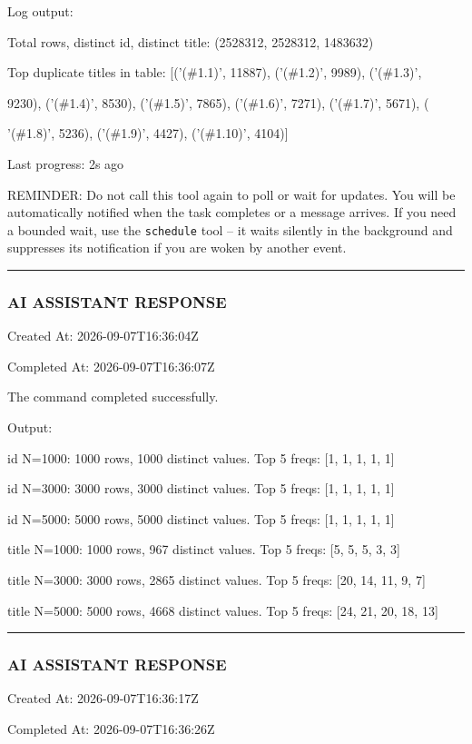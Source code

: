 \documentclass[11pt,a4paper]{article}
\begin{document}
Log output:

Total rows, distinct id, distinct title: (2528312, 2528312, 1483632)

Top duplicate titles in table: [('(\#1.1)', 11887), ('(\#1.2)', 9989), ('(\#1.3)',

9230), ('(\#1.4)', 8530), ('(\#1.5)', 7865), ('(\#1.6)', 7271), ('(\#1.7)', 5671), (

'(\#1.8)', 5236), ('(\#1.9)', 4427), ('(\#1.10)', 4104)]


Last progress: 2s ago



REMINDER: Do not call this tool again to poll or wait for updates. You will be automatically notified when the task completes or a message arrives. If you need a bounded wait, use the \texttt{schedule} tool -- it waits silently in the background and suppresses its notification if you are woken by another event.


\hrule

\subsubsection{AI ASSISTANT RESPONSE}

Created At: 2026-09-07T16:36:04Z

Completed At: 2026-09-07T16:36:07Z


The command completed successfully.

Output:

id N=1000: 1000 rows, 1000 distinct values. Top 5 freqs: [1, 1, 1, 1, 1]

id N=3000: 3000 rows, 3000 distinct values. Top 5 freqs: [1, 1, 1, 1, 1]

id N=5000: 5000 rows, 5000 distinct values. Top 5 freqs: [1, 1, 1, 1, 1]

title N=1000: 1000 rows, 967 distinct values. Top 5 freqs: [5, 5, 5, 3, 3]

title N=3000: 3000 rows, 2865 distinct values. Top 5 freqs: [20, 14, 11, 9, 7]

title N=5000: 5000 rows, 4668 distinct values. Top 5 freqs: [24, 21, 20, 18, 13]


\hrule

\subsubsection{AI ASSISTANT RESPONSE}

Created At: 2026-09-07T16:36:17Z

Completed At: 2026-09-07T16:36:26Z
\end{document}
